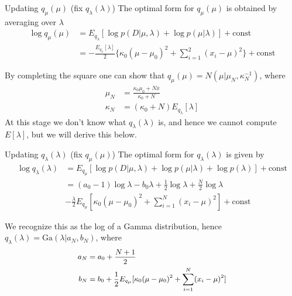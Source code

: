 \documentclass[10pt,mathserif]{beamer}
\begin{document}
\begin{frame}{Updating $q_\mu(\mu)$ (fix $q_\lambda(\lambda)$)}
The optimal form for $q_\mu(\mu)$ is obtained by averaging over $\lambda$
\begin{equation}
    \begin{split}
        \log q_\mu(\mu) 
        & = E_{q_\lambda} [\log p(D|\mu, \lambda) + \log p(\mu|\lambda)] + \mbox{const}\\
        & = -\frac{E_{q_\lambda} [\lambda]}{2} \{\kappa_0(\mu - \mu_0)^2 + \sum_{i=1}^2 (x_i - \mu)^2 \} + \mbox{const}
    \end{split}
\end{equation}

By completing the square one can show that $q_\mu(\mu) = N (\mu|\mu_N , \kappa_N^{-1} )$, where 
\begin{equation}
    \begin{split}
        \mu_N & = \frac{\kappa_0\mu_0 + N\bar{x}}{\kappa_0 + N}\\
        \kappa_N & = (\kappa_0 + N)E_{q_\lambda} [\lambda]
    \end{split}
\end{equation}
 At this stage we don't know what $q_\lambda(\lambda)$ is, and hence we cannot compute $E [\lambda]$, but we will derive this below.
\end{frame}

\begin{frame}{Updating $q_\lambda(\lambda)$ (fix $q_\mu(\mu)$)}
The optimal form for $q_\lambda(\lambda)$ is given by 
\begin{equation}
    \begin{split}
        \log q_\lambda(\lambda) 
        & = E_{q_\mu} [\log p(D|\mu, \lambda) + \log p(\mu|\lambda) + \log p(\lambda)] + \mbox{const} \\
        & = (a_0 - 1) \log \lambda - b_0\lambda + \frac{1}{2}\log \lambda + \frac{N}{2} \log \lambda \\
        & -\frac{\lambda }{2} E_{q_\mu} [\kappa_0(\mu - \mu_0)^2 +\sum_{i=1}^N (x_i - \mu)^2 ] + \mbox{const}
    \end{split}
\end{equation}

We recognize this as the log of a Gamma distribution, hence $q_\lambda(\lambda) = \mbox{Ga}(\lambda|a_N , b_N )$, where
\begin{equation}\small
    \begin{split}
        a_N & = a_0 + \frac{N + 1}{2}\\
        b_N & = b_0 + \frac{1}{2} E_{q_\mu} [\kappa_0(\mu - \mu_0)^ 2 +\sum_{i=1}^N (x_i - \mu)^2 ] 
    \end{split}
\end{equation}
\end{frame}
\end{document}
